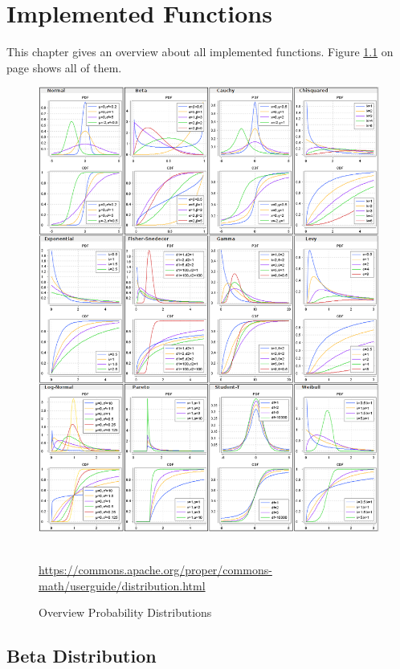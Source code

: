 
\chapter{Implemented Functions}

	This chapter gives an overview about all implemented functions. Figure \ref{fig:OverviewProbabilityDistributions} on page \pageref{fig:OverviewProbabilityDistributions} shows all of them.

	\begin{figure}[h]
		\centering
		\includegraphics[width=1\textwidth]{Figures/OverviewProbabilityDistributions}~\\
		\caption{Overview Probability Distributions}
		\url{https://commons.apache.org/proper/commons-math/userguide/distribution.html}
		\label{fig:OverviewProbabilityDistributions}
	\end{figure}

	\section{Beta Distribution}

